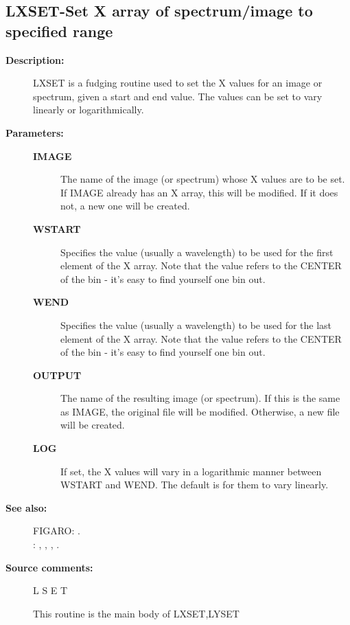 \begin{description}
\subsection{LXSET-\label{LXSET}Set X array of spectrum/image to specified range}
\begin{description}

\item [\textbf{Description:}]
 LXSET is a fudging routine used to set the X values for an image
 or spectrum, given a start and end value.  The values can be set
 to vary linearly or logarithmically.

\item [\textbf{Parameters:}]
\begin{description}
\item [\textbf{IMAGE}]
 The name of the image (or spectrum) whose
 X values are to be set.  If IMAGE already has an X
 array, this will be modified.  If it does not, a new
 one will be created.
\item [\textbf{WSTART}]
 Specifies the value (usually a wavelength)
 to be used for the first element of the X array.
 Note that the value refers to the CENTER of the
 bin - it's easy to find yourself one bin out.
\item [\textbf{WEND}]
 Specifies the value (usually a wavelength)
 to be used for the last element of the X array.
 Note that the value refers to the CENTER of the
 bin - it's easy to find yourself one bin out.
\item [\textbf{OUTPUT}]
 The name of the resulting image (or spectrum).
 If this is the same as IMAGE, the original
 file will be modified.  Otherwise, a new file
 will be created.
\item [\textbf{LOG}]
 If set, the X values will vary in a logarithmic
 manner between WSTART and WEND.  The default is
 for them to vary linearly.
\end{description}

\item [\textbf{See also:}]
FIGARO: .\\
: , , , .\\

\item [\textbf{Source comments:}]
\begin{terminalv}
 L S E T

 This routine is the main body of LXSET,LYSET


\end{terminalv}
\end{description}
\end{description}
